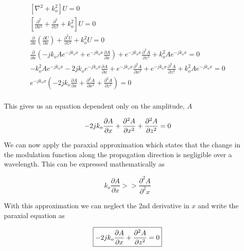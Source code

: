  \begin{equation}
 \begin{gathered}
 \left[ \nabla^2 + k_o^2\right]U = 0 \\
\left[\frac{\partial^2 }{\partial x^2} + \frac{\partial^2 }{\partial z^2} + k_o^2\right]U = 0 \\
\frac{\partial }{\partial x}\left(\frac{\partial U}{\partial x} \right) + \frac{\partial^2 U}{\partial z^2} + k_o^2 U = 0 \\
\frac{\partial }{\partial x}\left(-jk_oAe^{-jk_ox}+e^{-jk_ox}\frac{\partial A}{\partial x} \right) + e^{-jk_ox}\frac{\partial^2 A}{\partial z^2} + k_o^2 Ae^{-jk_ox} = 0 \\
-k_o^2Ae^{-jk_ox} -2jk_oe^{-jk_ox}\frac{\partial A}{\partial x}+e^{-jk_ox}\frac{\partial^2 A}{\partial x^2} + e^{-jk_ox}\frac{\partial^2 A}{\partial z^2} + k_o^2 Ae^{-jk_ox} = 0 \\
e^{-jk_ox}\left( -2jk_o\frac{\partial A}{\partial x}+\frac{\partial^2 A}{\partial x^2} + \frac{\partial^2 A}{\partial z^2}\right) = 0 \\
\end{gathered}
\label{gf_eq:41}
\end{equation}
 \renewcommand{\baselinestretch}{2} \small\normalsize
 
\noindent This gives us an equation dependent only on the amplitude, $A$

 \begin{equation}
-2jk_o\frac{\partial A}{\partial x}+\frac{\partial^2 A}{\partial x^2} + \frac{\partial^2 A}{\partial z^2} = 0 \\
\label{gf_eq:42}
\end{equation}
 \renewcommand{\baselinestretch}{2} \small\normalsize
 
 We can now apply the paraxial approximation which states that the change in the modulation function along the propagation direction is negligible over a wavelength. This can be expressed mathematically as
 
  \begin{equation}
k_o\frac{\partial A}{\partial x} >> \frac{\partial^2 A}{\partial^2 x}
\label{gf_eq:43}
\end{equation}
 \renewcommand{\baselinestretch}{2} \small\normalsize
 
 With this approximation we can neglect the 2nd derivative in $x$ and write the paraxial equation as
 
\begin{equation}
\boxed{-2jk_o\frac{\partial A}{\partial x} + \frac{\partial^2 A}{\partial z^2} = 0} \\
\label{gf_eq:44}
\end{equation}
\renewcommand{\baselinestretch}{2} \small\normalsize
 
